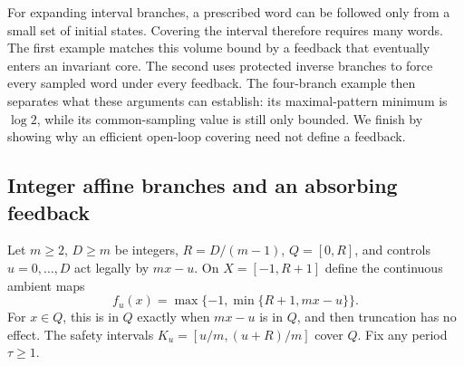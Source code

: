 \documentclass[11pt,reqno]{amsart}
\numberwithin{equation}{section}
\theoremstyle{definition}
\theoremstyle{definition}
\begin{document}
For expanding interval branches, a prescribed word can be followed
only from a small set of initial states. Covering the interval therefore
requires many words. The first example matches this volume bound by
a feedback that eventually enters an invariant core. The second uses
protected inverse branches to force every sampled word under every
feedback. The four-branch example then separates what these arguments
can establish: its maximal-pattern minimum is $\log2$, while its
common-sampling value is still only bounded. We finish by showing why
an efficient open-loop covering need not define a feedback.

\subsection{Integer affine branches and an absorbing feedback}
Let $m\ge2$, $D\ge m$ be integers, $R=D/(m-1)$,
$Q=[0,R]$, and controls $u=0,\ldots,D$ act legally by $mx-u$.
On $X=[-1,R+1]$ define the continuous ambient maps
\[
 f_u(x)=\max\{-1,\min\{R+1,mx-u\}\}.
\]
For $x\in Q$, this is in $Q$ exactly when $mx-u$ is in $Q$,
and then truncation has no effect. The safety intervals
$K_u=[u/m,(u+R)/m]$ cover $Q$. Fix any period $\tau\ge1$.
\end{document}
